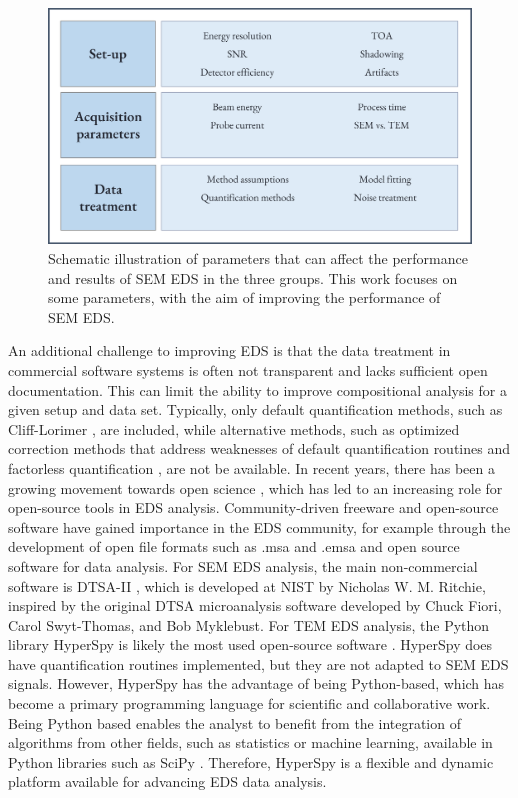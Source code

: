 \begin{figure}[!ht]
  \centering
  \includegraphics[width=0.8\linewidth]{figures/intro_parameters.png}
  \caption{
    Schematic illustration of parameters that can affect the performance and results of SEM EDS in the three groups.
    This work focuses on some parameters, with the aim of improving the performance of SEM EDS.
  }
  \label{fig:intro:parameters}
\end{figure}





An additional challenge to improving EDS is that the data treatment in commercial software systems is often not transparent and lacks sufficient open documentation.
This can limit the ability to improve compositional analysis for a given setup and data set.
Typically, only default quantification methods, such as Cliff-Lorimer \cite{CL1975}, are included, while alternative methods, such as optimized correction methods that address weaknesses of default quantification routines and factorless quantification \cite{nilsen_factorless_2021}, are not be available.
In recent years, there has been a growing movement towards open science \cite{opensource_2013}, which has led to an increasing role for open-source tools in EDS analysis.
Community-driven freeware and open-source software have gained importance in the EDS community, for example through the development of open file formats such as .msa and .emsa \cite{iso_emsa_22029} and open source software for data analysis.
For SEM EDS analysis, the main non-commercial software is DTSA-II \cite{dtsaii_1_getting_started}, which is developed at NIST by Nicholas W. M. Ritchie, inspired by the original DTSA microanalysis software developed by Chuck Fiori, Carol Swyt-Thomas, and Bob Myklebust.
For TEM EDS analysis, the Python library HyperSpy \cite{hyperspy_1.7.1} is likely the most used open-source software .
HyperSpy does have quantification routines implemented, but they are not adapted to SEM EDS signals.
However, HyperSpy has the advantage of being Python-based, which has become a primary programming language for scientific and collaborative work.
Being Python based enables the analyst to benefit from the integration of algorithms from other fields, such as statistics or machine learning, available in Python libraries such as SciPy \cite{2020SciPy}.
Therefore, HyperSpy is a flexible and dynamic platform available for advancing EDS data analysis.






